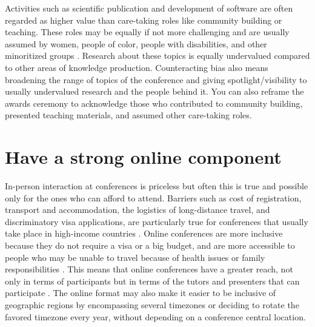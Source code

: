 \documentclass[10pt,letterpaper]{article}
\begin{document}
Activities such as scientific publication and development of software are often regarded as higher value than care-taking roles like community building or teaching. 
These roles may be equally if not more challenging and are usually assumed by women, people of color, people with disabilities, and other minoritized groups \cite{cheng2020x+, burfordHomelinessMeantHaving2020}. Research about these topics is equally undervalued compared to other areas of knowledge production. 
Counteracting bias also means broadening the range of topics of the conference and giving spotlight/visibility to usually undervalued research and the people behind it.
You can also reframe the awards ceremony to acknowledge those who contributed to community building, presented teaching materials, and assumed other care-taking roles.


\section{Have a strong online component} 
\label{rule_online}

In-person interaction at conferences is priceless but often this is true and possible only for the ones who can afford to attend. 
Barriers such as cost of registration, transport and accommodation, the logistics of long-distance travel, and discriminatory visa applications, are particularly true for conferences that usually take place in high-income countries \cite{arendDisparityConferenceRegistration2019,gewinWhatScientistsShould2019,jooKeepOnlineOption2021}. 
Online conferences are more inclusive because they do not require a visa or a big budget, and are more accessible to people who may be unable to travel because of health issues or family responsibilities \cite{salibaGettingGripsOnline2020}.
This means that online conferences have a greater reach, not only in terms of participants but in terms of the tutors and presenters that can participate \cite{atkinsonJournalMedicine20202021, roosOnlineConferencesNew2020, jooKeepOnlineOption2021}.
The online format may also make it easier to be inclusive of geographic regions by encompassing several timezones or deciding to rotate the favored timezone every year, without depending on a conference central location. 
\end{document}

